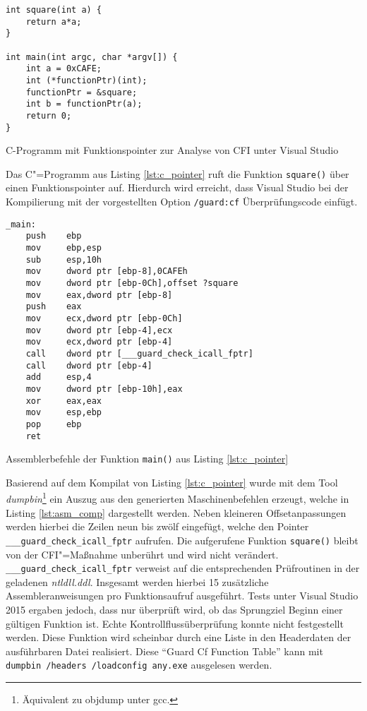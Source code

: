 \begin{listing}
\begin{verbatim}
int square(int a) {
	return a*a;
}

int main(int argc, char *argv[]) {
	int a = 0xCAFE;
	int (*functionPtr)(int);
	functionPtr = &square;
	int b = functionPtr(a);
	return 0;
}
\end{verbatim}
\caption{C-Programm mit Funktionspointer zur Analyse von CFI unter Visual Studio}
\label{lst:c_pointer}
\end{listing}

Das C"=Programm aus Listing \ref{lst:c_pointer} ruft die Funktion \texttt{square()} über einen Funktionspointer auf. Hierdurch wird erreicht, dass Visual Studio bei der Kompilierung mit der vorgestellten Option \texttt{/guard:cf} Überprüfungscode einfügt.

\begin{listing}
\begin{verbatim}
_main:
	push    ebp
	mov     ebp,esp
	sub     esp,10h
	mov     dword ptr [ebp-8],0CAFEh
	mov     dword ptr [ebp-0Ch],offset ?square
	mov     eax,dword ptr [ebp-8]
	push    eax
	mov     ecx,dword ptr [ebp-0Ch]
	mov     dword ptr [ebp-4],ecx
	mov     ecx,dword ptr [ebp-4]
	call    dword ptr [___guard_check_icall_fptr]
	call    dword ptr [ebp-4]
	add     esp,4
	mov     dword ptr [ebp-10h],eax
	xor     eax,eax
	mov     esp,ebp
	pop     ebp
	ret
\end{verbatim}
\caption{Assemblerbefehle der Funktion \texttt{main()} aus Listing \ref{lst:c_pointer}}
\label{lst:asm_comp}
\end{listing}

Basierend auf dem Kompilat von Listing \ref{lst:c_pointer} wurde mit dem Tool \emph{dumpbin}\footnote{Äquivalent zu objdump unter gcc.} ein Auszug aus den generierten Maschinenbefehlen erzeugt, welche in Listing \ref{lst:asm_comp} dargestellt werden. Neben kleineren Offsetanpassungen werden hierbei die Zeilen neun bis zwölf eingefügt, welche den Pointer \texttt{___guard_check_icall_fptr} aufrufen. Die aufgerufene Funktion \texttt{square()} bleibt von der CFI"=Maßnahme unberührt und wird nicht verändert. \texttt{___guard_check_icall_fptr} verweist auf die entsprechenden Prüfroutinen in der geladenen \emph{ntldll.ddl}. Insgesamt werden hierbei 15 zusätzliche Assembleranweisungen pro Funktionsaufruf ausgeführt. Tests unter Visual Studio 2015 ergaben jedoch, dass nur überprüft wird, ob das Sprungziel Beginn einer gültigen Funktion ist. Echte Kontrollflussüberprüfung konnte nicht festgestellt werden. Diese Funktion wird scheinbar durch eine Liste in den Headerdaten der ausführbaren Datei realisiert. Diese \enquote{Guard Cf Function Table} kann mit \texttt{ dumpbin /headers /loadconfig any.exe} ausgelesen werden.

